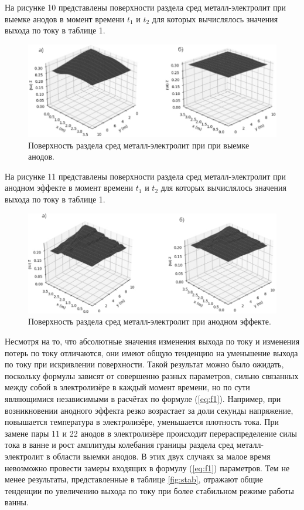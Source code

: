 \documentclass[pdflatex,sn-mathphys-gost]{pmi-jnl}
\begin{document}
На рисунке 10 представлены поверхности раздела сред металл-электролит при выемке анодов в момент времени $t_1$ и $t_2$ для которых вычислялось значения выхода по току в таблице 1.

\begin{figure}[ht]
    \centering
    \includegraphics[width=150mm]{Выемка анодов поверхность.png}
    \caption{Поверхность раздела сред металл-электролит при при выемке анодов.}
    \label{fig:viemkaanod} 
\end{figure}

На рисунке 11 представлены поверхности раздела сред металл-электролит при анодном эффекте в момент времени $t_1$ и $t_2$ для которых вычислялось значения выхода по току в таблице 1.

\begin{figure}[ht]
    \centering
    \includegraphics[width=150mm]{Анодный эффект поверхность.png}
    \caption{Поверхность раздела сред металл-электролит при анодном эффекте.}
    \label{fig:anodeffect}
\end{figure}

Несмотря на то, что абсолютные значения изменения выхода по току и изменения потерь по току отличаются, они имеют общую тенденцию на уменьшение выхода по току при искривлении поверхности. Такой результат можно было ожидать, поскольку формулы зависят от совершенно разных параметров, сильно связанных между собой в электролизёре в каждый момент времени, но по сути являющимися независимыми в расчётах по формуле (\ref{eq:f1}). Например, при возникновении анодного эффекта резко возрастает за доли секунды напряжение, повышается температура в электролизёре, уменьшается плотность тока. При замене пары 11 и 22 анодов в электролизёре происходит перераспределение силы тока в ванне и рост амплитуды колебания границы раздела сред металл-электролит в области выемки анодов. В этих двух случаях за малое время невозможно провести замеры входящих в формулу (\ref{eq:f1}) параметров. Тем не менее результаты, представленные в таблице \ref{fig:stab}, отражают общие тенденции по увеличению выхода по току при более стабильном режиме работы ванны.
\end{document}
